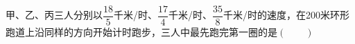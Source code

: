 甲、乙、丙三人分别以$\dfrac{18}{5}$千米/时、$\dfrac{17}{4}$千米/时、$\dfrac{35}{8}$千米/时的速度，在200米环形跑道上沿同样的方向开始计时跑步，三人中最先跑完第一圈的是\hfill$\left(\qquad\right)$
